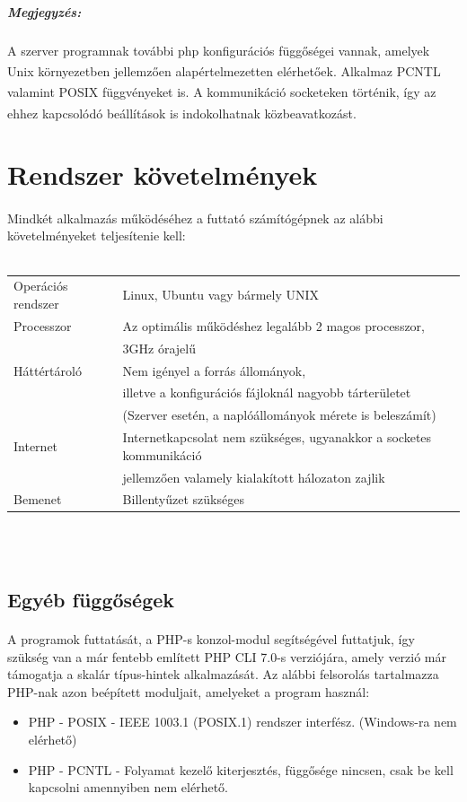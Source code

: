 \documentclass[12pt]{report}
\begin{document}
\subparagraph{Megjegyzés:}
A szerver programnak további php konfigurációs függőségei vannak, amelyek Unix környezetben jellemzően alapértelmezetten elérhetőek. Alkalmaz PCNTL\textsuperscript{\cite{phppcntl}} valamint POSIX \textsuperscript{\cite{phppos}} függvényeket is. A kommunikáció socketeken történik, így az ehhez kapcsolódó beállítások is indokolhatnak közbeavatkozást.\textsuperscript{\cite{phpsock}}

\pagebreak

\section{Rendszer követelmények}
\paragraph{}
	Mindkét alkalmazás működéséhez a futtató számítógépnek az alábbi követelményeket teljesítenie kell: \\ \\
  \begin{tabular}{l | l}
  Operációs rendszer & Linux, Ubuntu vagy bármely UNIX \\
  Processzor & Az optimális működéshez legalább 2 magos processzor, \\
  & 3GHz órajelű \\
  Háttértároló & Nem igényel a forrás állományok, \\
  & illetve a konfigurációs fájloknál nagyobb tárterületet \\
  & (Szerver esetén, a naplóállományok mérete is beleszámít)\\
  Internet & Internetkapcsolat nem szükséges, ugyanakkor a socketes kommunikáció \\
  & jellemzően valamely kialakított hálozaton zajlik\\
  Bemenet & Billentyűzet szükséges 
  \end{tabular} \\ \\
\subsection{Egyéb függőségek}
\paragraph{}
  A programok futtatását, a PHP-s konzol-modul segítségével futtatjuk, így szükség van a már fentebb említett PHP CLI 7.0-s verziójára, amely verzió már támogatja a skalár típus-hintek alkalmazását.
  Az alábbi felsorolás tartalmazza  PHP-nak azon beépített moduljait, amelyeket a program használ:
  \begin{itemize}
  \item PHP - POSIX - IEEE 1003.1 (POSIX.1) rendszer interfész. (Windows-ra nem elérhető)
  \item PHP - PCNTL - Folyamat kezelő kiterjesztés, függősége nincsen, csak be kell kapcsolni amennyiben nem elérhető.
  \end{itemize}
  
\end{document}

